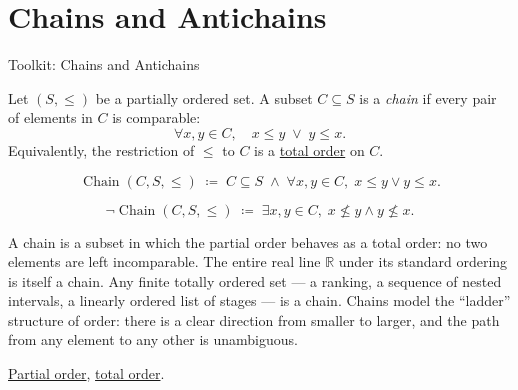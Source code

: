 
\section{Chains and Antichains}
\label{sec:chains-antichains}

\begin{definitionbox}{Toolkit: Chains and Antichains}
\begin{definition}[Chain]
\label{def:chain}
Let $(S, \leq)$ be a partially ordered set.  A subset $C \subseteq S$ is a
\emph{chain} if every pair of elements in $C$ is comparable:
\[
\forall x, y \in C, \quad x \leq y \;\lor\; y \leq x.
\]
Equivalently, the restriction of $\leq$ to $C$ is a
\hyperref[def:total-order]{total order} on $C$.
\end{definition}
\end{definitionbox}

\begin{remark*}
\[
\operatorname{Chain}(C, S, \leq)
\;\coloneqq\;
C \subseteq S
\;\land\;
\forall x, y \in C,\; x \leq y \lor y \leq x.
\]
\end{remark*}

\begin{remark*}
\[
\neg\operatorname{Chain}(C, S, \leq)
\;\coloneqq\;
\exists x, y \in C,\; x \not\leq y \land y \not\leq x.
\]
\end{remark*}

\begin{remark*}[Interpretation]
A chain is a subset in which the partial order behaves as a total order:
no two elements are left incomparable.  The entire real line $\mathbb{R}$
under its standard ordering is itself a chain.  Any finite totally ordered
set — a ranking, a sequence of nested intervals, a linearly ordered list
of stages — is a chain.  Chains model the ``ladder'' structure of order:
there is a clear direction from smaller to larger, and the path from any
element to any other is unambiguous.
\end{remark*}

\begin{remark*}[Dependencies]
\hyperref[def:partial-order]{Partial order},
\hyperref[def:total-order]{total order}.
\end{remark*}


